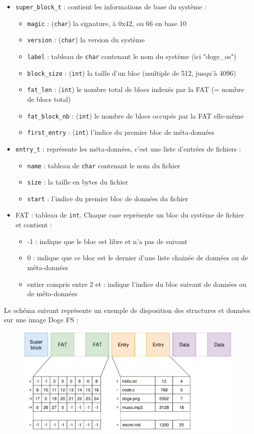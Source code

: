 \documentclass[a4paper, 12pt]{article}
\begin{document}
\begin{itemize}
	\item \texttt{super_block_t} : contient les informations de base du système :
	\begin{itemize}
		\item \texttt{magic} : (\texttt{char}) la signature, à 0x42, ou 66 en base 10
		\item \texttt{version} : (\texttt{char}) la version du système
		\item \texttt{label} : tableau de \texttt{char} contenant le nom du système (ici "doge\_os")
		\item \texttt{block_size} : (\texttt{int}) la taille d'un bloc (multiple de 512, jusqu'à 4096)
		\item \texttt{fat_len} : (\texttt{int}) le nombre total de blocs indexés par la FAT (= nombre de blocs total)
		\item \texttt{fat_block_nb} : (\texttt{int}) le nombre de blocs occupés par la FAT elle-même
		\item \texttt{first_entry} : (\texttt{int}) l'indice du premier bloc de méta-données
	\end{itemize}
	\item \texttt{entry_t} : représente les méta-données, c'est une liste d'entrées de fichiers : 
	\begin{itemize}
		\item \texttt{name} : tableau de \texttt{char} contenant le nom du fichier
		\item \texttt{size} : la taille en bytes du fichier
		\item \texttt{start} : l'indice du premier bloc de données du fichier
	\end{itemize}
	\item FAT : tableau de \texttt{int}. Chaque case représente un bloc du système de fichier et contient : 
	\begin{itemize}
		\item -1 : indique que le bloc est libre et n'a pas de suivant
		\item 0 : indique que ce bloc est le dernier d'une liste chainée de données ou de méta-données
		\item entier compris entre 2 et  : indique l'indice du bloc suivant de données ou de méta-données
	\end{itemize}
\end{itemize}
Le schéma suivant représente un exemple de disposition des structures et données sur une image Doge FS :
\begin{figure}
	\begin{center}
		\includegraphics[width=1.0\textwidth]{schema.png}
	\end{center}
\end{figure}
\end{document}
